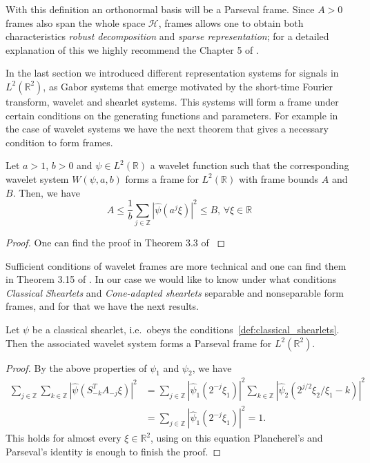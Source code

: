 \bigskip

With this definition an orthonormal basis will be a Parseval frame. Since $A>0$ frames also span the whole space $\mathcal{H}$, frames allows one to obtain both characteristics \textit{robust decomposition} and \textit{sparse representation}; for a detailed explanation of this we highly recommend the Chapter 5 of \cite{Mallat}.

\bigskip

In the last section we introduced different representation systems for signals in $L^2(\mathbb{R}^2)$, as Gabor systems that emerge motivated by the short-time Fourier transform, wavelet and shearlet systems. This systems will form a frame under certain conditions on the generating functions and parameters. For example in the case of wavelet systems we have the next theorem that gives a necessary condition to form frames.

\bigskip

\begin{thm}
Let $a>1$, $b>0$ and $\psi\in L^2(\mathbb{R})$ a wavelet function such that the corresponding wavelet system $W(\psi,a,b)$ forms a frame for $L^2(\mathbb{R})$ with frame bounds $A$ and $B$. Then, we have
$$
A\leq \frac{1}{b}\sum_{j\in\mathbb{Z}}|\hat{\psi}(a^j\xi)|^2\leq B \text{,   }\forall\xi\in\mathbb{R}
$$
\end{thm}
\begin{proof}
One can find the proof in Theorem 3.3 of \cite{daubechies}
\end{proof}

\bigskip

Sufficient conditions of wavelet frames are more technical and one can find them in Theorem 3.15 of \cite{Gitta-notes}. In our case we would like to know under what conditions \textit{Classical Shearlets} and \textit{Cone-adapted shearlets} separable and nonseparable form frames, and for that we have the next results.

\begin{thm}
Let $\psi$ be a classical shearlet, i.e.\ obeys the conditions~\ref{def:classical_shearlets}. Then the associated wavelet system forms a Parseval frame for $L^2(\mathbb{R}^2)$.

\end{thm}
\begin{proof}
By the above properties of $\psi_1$ and $\psi_2$, we have
$$
\begin{aligned}
\sum_{j\in\mathbb{Z}}\sum_{k\in\mathbb{Z}}|\hat{\psi}(S^T_{-k}A_{-j}\xi)|^2&=\sum_{j\in\mathbb{Z}}|\hat{\psi}_1(2^{-j}\xi_1)|^2\sum_{k\in\mathbb{Z}}|\hat{\psi}_2(2^{j/2}\xi_2/\xi_1-k)|^2\\
&=\sum_{j\in\mathbb{Z}}|\hat{\psi}_1(2^{-j}\xi_1)|^2=1.
\end{aligned}
$$
This holds for almost every $\xi\in\mathbb{R}^2$, using on this equation Plancherel's and Parseval's identity is enough to finish the proof.
\end{proof}

